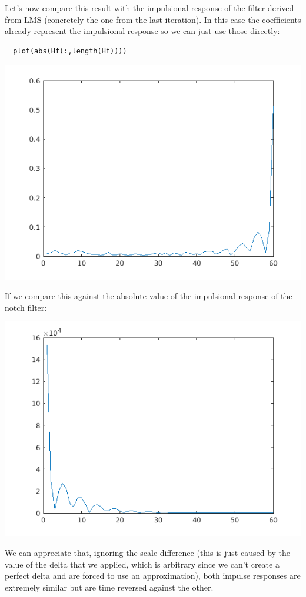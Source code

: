 \documentclass[conference,9pt]{IEEEtran}
\begin{document}
Let's now compare this result with the impulsional response of the filter derived from LMS (concretely the one from the last iteration). In this case the coefficients already represent the impulsional response so we can just use those directly:
\begin{verbatim}
  plot(abs(Hf(:,length(Hf))))
\end{verbatim}

\includegraphics[scale=0.6]{im-lms.png}

If we compare this against the absolute value of the impulsional response of the notch filter:

\includegraphics[scale=0.6]{im-abs.png}

We can appreciate that, ignoring the scale difference (this is just caused by the value of the delta that we applied, which is arbitrary since we can't create a perfect delta and are forced to use an approximation), both impulse responses are extremely similar but are time reversed against the other.
\end{document}
